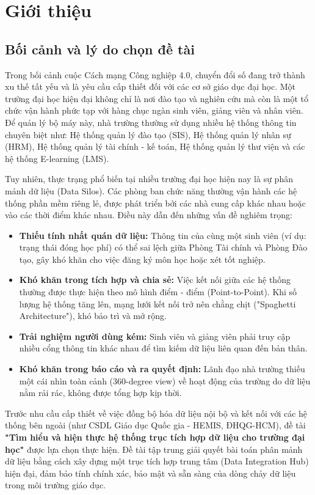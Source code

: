 \chapter{Giới thiệu}

\section{Bối cảnh và lý do chọn đề tài}

Trong bối cảnh cuộc Cách mạng Công nghiệp 4.0, chuyển đổi số đang trở thành xu thế tất yếu và là yêu cầu cấp thiết đối với các cơ sở giáo dục đại học. Một trường đại học hiện đại không chỉ là nơi đào tạo và nghiên cứu mà còn là một tổ chức vận hành phức tạp với hàng chục ngàn sinh viên, giảng viên và nhân viên. Để quản lý bộ máy này, nhà trường thường sử dụng nhiều hệ thống thông tin chuyên biệt như: Hệ thống quản lý đào tạo (SIS), Hệ thống quản lý nhân sự (HRM), Hệ thống quản lý tài chính - kế toán, Hệ thống quản lý thư viện và các hệ thống E-learning (LMS).

Tuy nhiên, thực trạng phổ biến tại nhiều trường đại học hiện nay là sự phân mảnh dữ liệu (Data Silos). Các phòng ban chức năng thường vận hành các hệ thống phần mềm riêng lẻ, được phát triển bởi các nhà cung cấp khác nhau hoặc vào các thời điểm khác nhau. Điều này dẫn đến những vấn đề nghiêm trọng:

\begin{itemize}
    \item \textbf{Thiếu tính nhất quán dữ liệu:} Thông tin của cùng một sinh viên (ví dụ: trạng thái đóng học phí) có thể sai lệch giữa Phòng Tài chính và Phòng Đào tạo, gây khó khăn cho việc đăng ký môn học hoặc xét tốt nghiệp.
    \item \textbf{Khó khăn trong tích hợp và chia sẻ:} Việc kết nối giữa các hệ thống thường được thực hiện theo mô hình điểm - điểm (Point-to-Point). Khi số lượng hệ thống tăng lên, mạng lưới kết nối trở nên chằng chịt ("Spaghetti Architecture"), khó bảo trì và mở rộng.
    \item \textbf{Trải nghiệm người dùng kém:} Sinh viên và giảng viên phải truy cập nhiều cổng thông tin khác nhau để tìm kiếm dữ liệu liên quan đến bản thân.
    \item \textbf{Khó khăn trong báo cáo và ra quyết định:} Lãnh đạo nhà trường thiếu một cái nhìn toàn cảnh (360-degree view) về hoạt động của trường do dữ liệu nằm rải rác, không được tổng hợp kịp thời.
\end{itemize}

Trước nhu cầu cấp thiết về việc đồng bộ hóa dữ liệu nội bộ và kết nối với các hệ thống bên ngoài (như CSDL Giáo dục Quốc gia - HEMIS, ĐHQG-HCM), đề tài \textbf{"Tìm hiểu và hiện thực hệ thống trục tích hợp dữ liệu cho trường đại học"} được lựa chọn thực hiện. Đề tài tập trung giải quyết bài toán phân mảnh dữ liệu bằng cách xây dựng một trục tích hợp trung tâm (Data Integration Hub) hiện đại, đảm bảo tính chính xác, bảo mật và sẵn sàng của dòng chảy dữ liệu trong môi trường giáo dục.

